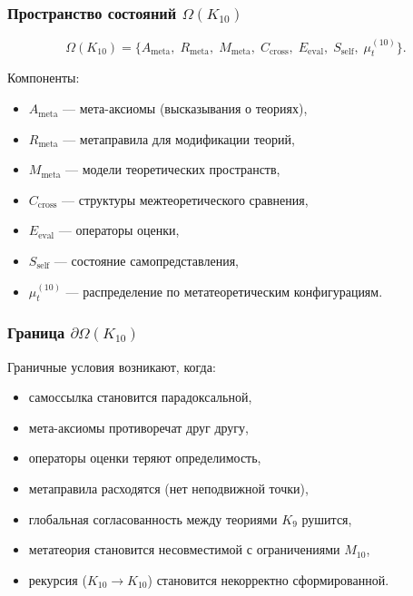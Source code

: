 \subsubsection{Пространство состояний $\Omega(K_{10})$}

\[
\Omega(K_{10})=
\{
A_{\mathrm{meta}},\;
R_{\mathrm{meta}},\;
M_{\mathrm{meta}},\;
C_{\mathrm{cross}},\;
E_{\mathrm{eval}},\;
S_{\mathrm{self}},\;
\mu^{(10)}_t
\}.
\]

Компоненты:
\begin{itemize}
    \item $A_{\mathrm{meta}}$ — мета-аксиомы (высказывания о теориях),
    \item $R_{\mathrm{meta}}$ — метаправила для модификации теорий,
    \item $M_{\mathrm{meta}}$ — модели теоретических пространств,
    \item $C_{\mathrm{cross}}$ — структуры межтеоретического сравнения,
    \item $E_{\mathrm{eval}}$ — операторы оценки,
    \item $S_{\mathrm{self}}$ — состояние самопредставления,
    \item $\mu^{(10)}_t$ — распределение по метатеоретическим конфигурациям.
\end{itemize}

\subsubsection{Граница $\partial\Omega(K_{10})$}

Граничные условия возникают, когда:
\begin{itemize}
    \item самоссылка становится парадоксальной,
    \item мета-аксиомы противоречат друг другу,
    \item операторы оценки теряют определимость,
    \item метаправила расходятся (нет неподвижной точки),
    \item глобальная согласованность между теориями $K_9$ рушится,
    \item метатеория становится несовместимой с ограничениями $M_{10}$,
    \item рекурсия ($K_{10}\to K_{10}$) становится некорректно сформированной.
\end{itemize}

